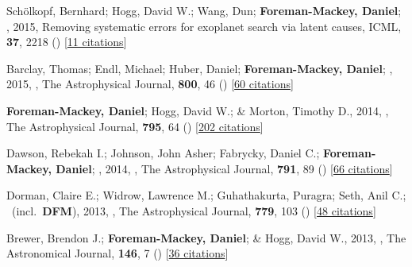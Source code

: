 \item[{\color{numcolor}\scriptsize8}] Sch{\"o}lkopf, Bernhard; Hogg, David W.; Wang, Dun; \textbf{Foreman-Mackey, Daniel}; \etal, 2015, Removing systematic errors for exoplanet search via latent causes, ICML, \textbf{37}, 2218 () [\href{https://scholar.google.com/scholar?cites=11768165421845046384}{11 citations}]

\item[{\color{numcolor}\scriptsize7}] Barclay, Thomas; Endl, Michael; Huber, Daniel; \textbf{Foreman-Mackey, Daniel}; \etal, 2015, , The Astrophysical Journal, \textbf{800}, 46 () [\href{https://ui.adsabs.harvard.edu/abs/2015ApJ...800...46B}{60 citations}]

\item[{\color{numcolor}\scriptsize6}] \textbf{Foreman-Mackey, Daniel}; Hogg, David W.; \& Morton, Timothy D., 2014, , The Astrophysical Journal, \textbf{795}, 64 () [\href{https://ui.adsabs.harvard.edu/abs/2014ApJ...795...64F}{202 citations}]

\item[{\color{numcolor}\scriptsize5}] Dawson, Rebekah I.; Johnson, John Asher; Fabrycky, Daniel C.; \textbf{Foreman-Mackey, Daniel}; \etal, 2014, , The Astrophysical Journal, \textbf{791}, 89 () [\href{https://ui.adsabs.harvard.edu/abs/2014ApJ...791...89D}{66 citations}]

\item[{\color{numcolor}\scriptsize4}] Dorman, Claire E.; Widrow, Lawrence M.; Guhathakurta, Puragra; Seth, Anil C.; \etal\ (incl.\ \textbf{DFM}), 2013, , The Astrophysical Journal, \textbf{779}, 103 () [\href{https://ui.adsabs.harvard.edu/abs/2013ApJ...779..103D}{48 citations}]

\item[{\color{numcolor}\scriptsize3}] Brewer, Brendon J.; \textbf{Foreman-Mackey, Daniel}; \& Hogg, David W., 2013, , The Astronomical Journal, \textbf{146}, 7 () [\href{https://ui.adsabs.harvard.edu/abs/2013AJ....146....7B}{36 citations}]

